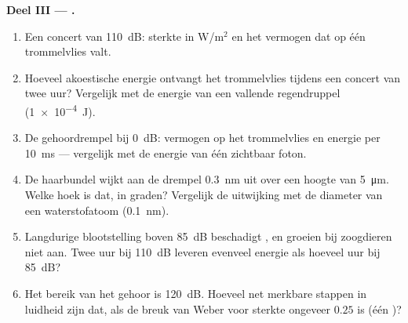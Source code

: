 \begin{problem}
\medskip
\noindent\textbf{Deel III --- .}
\begin{enumerate}[resume]
  \item Een concert van \qty{110}{dB}: sterkte in W/m$^{2}$ en het
        vermogen dat op één trommelvlies valt.
  \item Hoeveel akoestische energie ontvangt het trommelvlies tijdens
        een concert van twee uur? Vergelijk met de energie van een
        vallende regendruppel (\qty{1e-4}{J}).
  \item De gehoordrempel bij \qty{0}{dB}: vermogen op het trommelvlies
        en energie per \qty{10}{ms} --- vergelijk met de energie van
        één zichtbaar foton.
  \item De haarbundel wijkt aan de drempel \qty{0.3}{nm} uit over een
        hoogte van \qty{5}{\micro m}. Welke hoek is dat, in graden?
        Vergelijk de uitwijking met de diameter van een waterstofatoom
        (\qty{0.1}{nm}).
  \item Langdurige blootstelling boven \qty{85}{dB} beschadigt
        , en  groeien bij zoogdieren niet aan. Twee
        uur bij \qty{110}{dB} leveren evenveel energie als hoeveel uur
        bij \qty{85}{dB}?
  \item Het bereik van het gehoor is \qty{120}{dB}. Hoeveel net
        merkbare stappen in luidheid zijn dat, als de breuk van Weber
        voor sterkte ongeveer $0.25$ is (één )?
\end{enumerate}


\end{problem}
